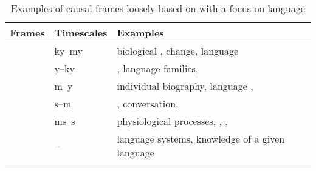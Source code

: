\begin{table}
\caption{Examples of {causal frames} loosely based on \cite[13–17]{Enfield2014} with a focus on language}
\label{tab:1}

\begin{tabularx}{\textwidth}{llQ}
\lsptoprule
\textbf{Frames} & \textbf{Timescales} & \textbf{Examples}\\
\midrule
{} & ky--my & biological ,  change, language \\
 & y--ky & , language families, \\
 & m--y & individual biography, language , \\
 & s--m & , conversation, \\
 & ms--s & physiological processes, , , \\
 & -- & language systems, knowledge of a given language\\
\lspbottomrule
\end{tabularx}
\end{table}

